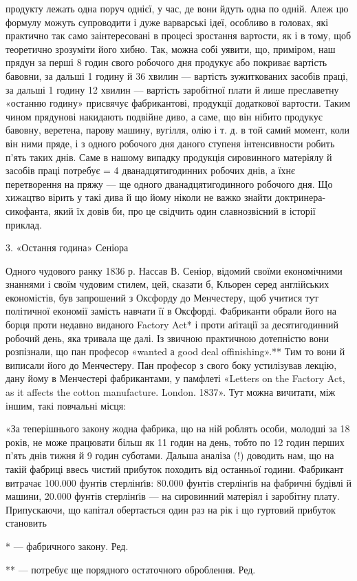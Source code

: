продукту лежать одна поруч однієї, у час, де вони йдуть одна по одній. Алеж цю формулу можуть
супроводити і дуже варварські ідеї, особливо в головах, які практично так само заінтересовані
в процесі зростання вартости, як і в тому, щоб теоретично зрозуміти його хибно. Так, можна собі
уявити, що, приміром, наш прядун за перші 8 годин свого робочого дня продукує або покриває вартість
бавовни, за дальші 1 годину й 36 хвилин — вартість зужиткованих засобів праці, за дальші 1 годину 12
хвилин — вартість заробітної плати й лише преславетну «останню
годину» присвячує фабрикантові, продукції додаткової вартости. Таким чином прядунові накидають
подвійне диво, а саме, що він нібито продукує бавовну, веретена, парову машину, вугілля,
олію і т. д. в той самий момент, коли він ними пряде, і з одного робочого дня даного ступеня
інтенсивности робить п’ять
таких днів. Саме в нашому випадку продукція сировинного матеріялу й засобів праці потребує  = 4
дванадцятигодинних робочих днів, а їхнє перетворення на пряжу — ще одного дванадцятигодинного
робочого дня. Що хижацтво вірить у такі дива й що йому ніколи не важко знайти доктринера-сикофанта,
який їх довів би, про це свідчить один славнозвісний в історії приклад.

3. «Остання година» Сеніора

Одного чудового ранку 1836 р. Нассав В. Сеніор, відомий своїми економічними знаннями і своїм чудовим
стилем, цей, сказати б, Кльорен серед англійських економістів, був запрошений
з Оксфорду до Менчестеру, щоб учитися тут політичної економії замість навчати її в Оксфорді.
Фабриканти обрали його на борця проти недавно виданого Factory Act* і проти аґітації за
десятигодинний
робочий день, яка тривала ще далі. Із звичною практичною дотепністю вони розпізнали, що пан професор
«wanted а
good deal offinishing».** Тим то вони й виписали його до Менчестеру. Пан професор з свого боку
устилізував лекцію, дану йому в Менчестері фабрикантами, у памфлеті «Letters on the Factory Act, as
it affects the cotton manufacture. London. 1837». Тут можна вичитати, між іншим, такі повчальні
місця:

«За теперішнього закону жодна фабрика, що на ній роблять особи, молодші за 18 років, не може
працювати більш як 11 годин на день, тобто по 12 годин перших п’ять днів тижня й 9 годин
суботами. Дальша аналіза (!) доводить нам, що на такій фабриці ввесь чистий прибуток походить від
останньої години. Фабрикант
витрачає 100.000 фунтів стерлінґів: 80.000 фунтів стерлінґів на фабричні будівлі й машини, 20.000
фунтів стерлінґів — на сировинний матеріял і заробітну плату. Припускаючи, що капітал обертається
один раз на рік і що гуртовий прибуток становить

* — фабричного закону. Ред.

** — потребує ще порядного остаточного оброблення. Ред.
